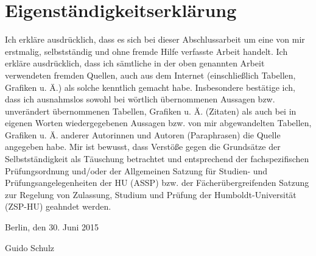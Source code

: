 
\section*{Eigenständigkeitserklärung}

Ich erkläre ausdrücklich, dass es sich bei dieser Abschlussarbeit um eine von mir erstmalig, selbstständig und ohne fremde Hilfe verfasste Arbeit handelt. Ich erkläre ausdrücklich, dass ich sämtliche in der oben genannten Arbeit
verwendeten fremden Quellen, auch aus dem Internet (einschließlich Tabellen,
Grafiken u. Ä.) als solche kenntlich gemacht habe. Insbesondere bestätige ich,
dass ich ausnahmslos sowohl bei wörtlich übernommenen Aussagen bzw.
unverändert übernommenen Tabellen, Grafiken u. Ä. (Zitaten) als auch bei in
eigenen Worten wiedergegebenen Aussagen bzw. von mir abgewandelten
Tabellen, Grafiken u. Ä. anderer Autorinnen und Autoren (Paraphrasen) die
Quelle angegeben habe. Mir ist bewusst, dass Verstöße gegen die Grundsätze der Selbstständigkeit als
Täuschung betrachtet und entsprechend der fachspezifischen Prüfungsordnung
und/oder der Allgemeinen Satzung für Studien- und Prüfungsangelegenheiten
der HU (ASSP) bzw. der Fächerübergreifenden Satzung zur Regelung von
Zulassung, Studium und Prüfung der Humboldt-Universität (ZSP-HU) geahndet
werden.

\vspace{1cm}

Berlin, den 30. Juni 2015 \vspace{1.5cm}

Guido Schulz
